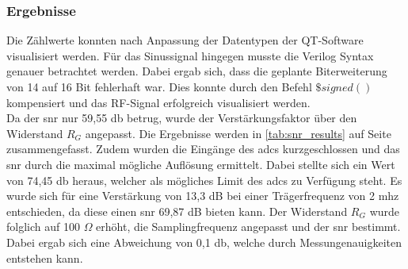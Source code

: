 \subsubsection*{Ergebnisse}
Die Zählwerte konnten nach Anpassung der Datentypen der QT-Software visualisiert werden. Für das Sinussignal hingegen musste die Verilog Syntax genauer betrachtet werden. Dabei ergab sich, dass die geplante Biterweiterung von 14 auf 16 Bit fehlerhaft war. Dies konnte durch den Befehl $\$signed()$ kompensiert und das RF-Signal erfolgreich visualisiert werden.\\
Da der \ac{snr} nur 59,55 \ac{db} betrug, wurde der Verstärkungsfaktor über den Widerstand $R_G$ angepasst. Die Ergebnisse werden in \autoref{tab:snr_results} auf Seite \pageref{tab:snr_results} zusammengefasst. Zudem wurden die Eingänge des \ac{adc}s kurzgeschlossen und das \ac{snr} durch die maximal mögliche Auflösung ermittelt. Dabei stellte sich ein Wert von 74,45 \ac{db} heraus, welcher als mögliches Limit des \ac{adc}s zu Verfügung steht. Es wurde sich für eine Verstärkung von 13,3 dB bei einer Trägerfrequenz von 2 \ac{mhz} entschieden, da diese einen \ac{snr} 69,87 dB bieten kann. Der Widerstand $R_G$ wurde folglich auf 100 $\Omega$ erhöht, die Samplingfrequenz angepasst und der \ac{snr} bestimmt. Dabei ergab sich eine Abweichung von 0,1 \ac{db}, welche durch Messungenauigkeiten entstehen kann.
